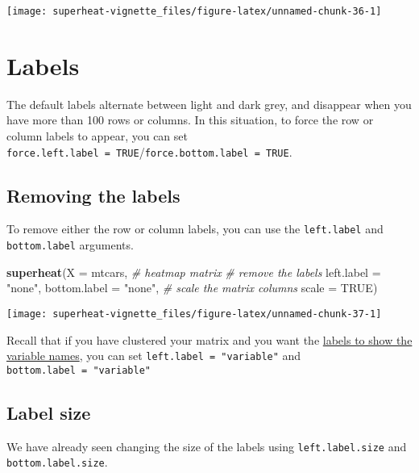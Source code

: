 \documentclass[]{book}
\newenvironment{Shaded}{\begin{snugshade}}{\end{snugshade}}
\newcommand{\KeywordTok}[1]{\textcolor[rgb]{0.13,0.29,0.53}{\textbf{{#1}}}}
\newcommand{\DataTypeTok}[1]{\textcolor[rgb]{0.13,0.29,0.53}{{#1}}}
\newcommand{\StringTok}[1]{\textcolor[rgb]{0.31,0.60,0.02}{{#1}}}
\newcommand{\CommentTok}[1]{\textcolor[rgb]{0.56,0.35,0.01}{\textit{{#1}}}}
\newcommand{\OtherTok}[1]{\textcolor[rgb]{0.56,0.35,0.01}{{#1}}}
\newcommand{\NormalTok}[1]{{#1}}
\theoremstyle{definition}
\theoremstyle{definition}
\theoremstyle{remark}
\begin{document}
\begin{center}\texttt{[image: superheat-vignette\_files/figure-latex/unnamed-chunk-36-1]} \end{center}

\chapter{Labels}\label{labels}

The default labels alternate between light and dark grey, and disappear
when you have more than 100 rows or columns. In this situation, to force
the row or column labels to appear, you can set
\texttt{force.left.label\ =\ TRUE}/\texttt{force.bottom.label\ =\ TRUE}.

\section{Removing the labels}\label{removing-the-labels}

To remove either the row or column labels, you can use the
\texttt{left.label} and \texttt{bottom.label} arguments.

\begin{Shaded}
\begin{Highlighting}[]
\KeywordTok{superheat}\NormalTok{(}\DataTypeTok{X =} \NormalTok{mtcars, }\CommentTok{# heatmap matrix}
          \CommentTok{# remove the labels}
          \DataTypeTok{left.label =} \StringTok{"none"}\NormalTok{,}
          \DataTypeTok{bottom.label =} \StringTok{"none"}\NormalTok{,}
          \CommentTok{# scale the matrix columns}
          \DataTypeTok{scale =} \OtherTok{TRUE}\NormalTok{)}
\end{Highlighting}
\end{Shaded}

\begin{center}\texttt{[image: superheat-vignette\_files/figure-latex/unnamed-chunk-37-1]} \end{center}

Recall that if you have clustered your matrix and you want the
\protect\hyperlink{generate-clust}{labels to show the variable names},
you can set \texttt{left.label\ =\ "variable"} and
\texttt{bottom.label\ =\ "variable"}

\section{Label size}\label{label-size}

We have already seen changing the size of the labels using
\texttt{left.label.size} and \texttt{bottom.label.size}.
\end{document}
